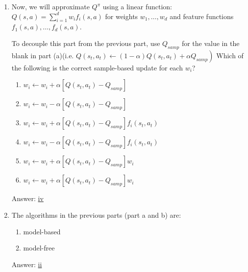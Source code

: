\documentclass[11pt, answers]{exam}
\begin{document}
\begin{enumerate}
\begin{enumerate}
\item Now, we will approximate $Q^{\pi}$ using a linear function: $Q(s, a)=\sum_{i=1}^{d} w_{i} f_{i}(s, a)$ for weights $w_{1}, \dots, w_{d}$ and feature functions $f_{1}(s, a), \ldots, f_{d}(s, a)$.

To decouple this part from the previous part, use $Q_{samp}$ for the value in the blank in part (a)(i.e. $\left.Q\left(s_{t}, a_{t}\right) \leftarrow(1-\alpha) Q\left(s_{t}, a_{t}\right)+\alpha Q_{s a m p}\right)$
Which of the following is the correct sample-based update for each $w_i$?
\begin{enumerate}
\item $w_{i} \leftarrow w_{i}+\alpha\left[Q\left(s_{t}, a_{t}\right)-Q_{s a m p}\right]$

\item $w_{i} \leftarrow w_{i}-\alpha\left[Q\left(s_{t}, a_{t}\right)-Q_{s a m p}\right]$

\item $w_{i} \leftarrow w_{i}+\alpha\left[Q\left(s_{t}, a_{t}\right)-Q_{s a m p}\right] f_{i}\left(s_{t}, a_{t}\right)$

\item $w_{i} \leftarrow w_{i}-\alpha\left[Q\left(s_{t}, a_{t}\right)-Q_{s a m p}\right] f_{i}\left(s_{t}, a_{t}\right)$

\item $w_{i} \leftarrow w_{i}+\alpha\left[Q\left(s_{t}, a_{t}\right)-Q_{s a m p}\right]w_i$

\item $w_{i} \leftarrow w_{i}+\alpha\left[Q\left(s_{t}, a_{t}\right)-Q_{s a m p}\right]w_i$
\end{enumerate}
Answer: \underline{ iv }

\item The algorithms in the previous parts (part a and b) are:
\begin{enumerate}
\item model-based
\item model-free
\end{enumerate}
Answer: \underline{ ii }
\end{enumerate}
\end{enumerate}
\end{document}
